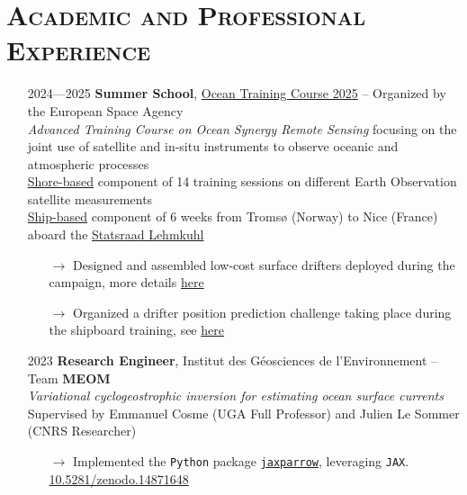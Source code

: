 \documentclass{article}
\begin{document}
\section*{\textsc{Academic and Professional Experience}}
\begin{itemize}
    \item[] 2024—2025 \tabto{2cm} \textbf{Summer School}, \href{https://oceantrainingcourse2025.esa.int/}{Ocean Training Course 2025} – Organized by the European Space Agency \\[.1 cm]
    \tabto{2cm} \textit{Advanced Training Course on Ocean Synergy Remote Sensing} focusing on the joint use of satellite and \tabto{2cm} in-situ instruments to observe oceanic and atmospheric processes \\[.1 cm]
    \tabto{2cm} \underline{Shore-based} component of 14 training sessions on different Earth Observation satellite measurements \\[.1 cm]
    \tabto{2cm} \underline{Ship-based} component of 6 weeks from Tromsø (Norway) to Nice (France) aboard the \href{https://lehmkuhl.no/en/}{Statsraad Lehmkuhl}
    \vspace{-.4 cm}
    \begin{itemize}[left=2cm]
        \item[$\rightarrow$] Designed and assembled low-cost surface drifters deployed during the campaign, more details \href{https://github.com/vadmbertr/otc25-cannelloni}{here}
        \item[$\rightarrow$] Organized a drifter position prediction challenge taking place during the shipboard training, see \href{https://vadmbertr.github.io/otc25-virtual-drift/}{here}
    \end{itemize}

    \item[] 2023 \tabto{2cm} \textbf{Research Engineer}, Institut des Géosciences de l'Environnement – Team \textbf{MEOM} \\[.1 cm]
    \tabto{2cm} \textit{Variational cyclogeostrophic inversion for estimating ocean surface currents} \\[.1 cm]
    \tabto{2cm} Supervised by Emmanuel Cosme (UGA Full Professor) and Julien Le Sommer (CNRS Researcher)
    \vspace{-.1 cm}
    \begin{itemize}[left=2cm]
        \item[$\rightarrow$] Implemented the \texttt{Python} package \href{https://github.com/meom-group/jaxparrow}{\texttt{jaxparrow}}, leveraging \texttt{JAX}. \href{https://doi.org/10.5281/zenodo.14871648}{10.5281/zenodo.14871648}
    \end{itemize}
    

\end{itemize}
\end{document}
